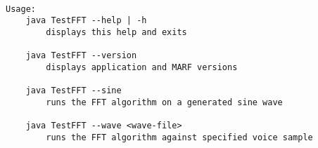 \begin{verbatim}

Usage:
    java TestFFT --help | -h
        displays this help and exits

    java TestFFT --version
        displays application and MARF versions

    java TestFFT --sine
        runs the FFT algorithm on a generated sine wave

    java TestFFT --wave <wave-file>
        runs the FFT algorithm against specified voice sample

\end{verbatim}
